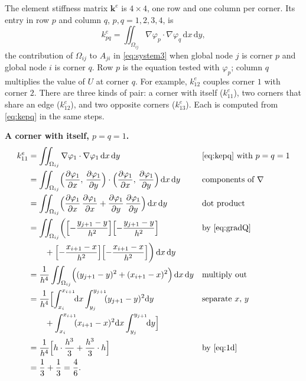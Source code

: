 \documentclass[11pt]{article}
\newcommand{\dxdy}{\,\mathrm{d}x\,\mathrm{d}y}
\newcommand{\Om}{\Omega}
\newcommand{\grad}{\nabla}
\begin{document}
The element stiffness matrix $\bm k^{e}$ is $4\times4$, one row and one
column per corner.  Its entry in row $p$ and column $q$, $p,q=1,2,3,4$, is
\begin{equation}\label{eq:kepq}
  k^{e}_{pq}=\iint_{\Om_{ij}}\grad\varphi_{p}\cdot\grad\varphi_{q}\dxdy ,
\end{equation}
the contribution of $\Om_{ij}$ to $A_{ji}$ in \eqref{eq:system3} when global
node $j$ is corner $p$ and global node $i$ is corner $q$.  Row $p$ is the
equation tested with $\varphi_{p}$; column $q$ multiplies the value of $U$ at
corner $q$.  For example, $k^{e}_{12}$ couples corner $1$ with corner $2$.
There are three kinds of pair: a corner with itself ($k^{e}_{11}$), two
corners that share an edge ($k^{e}_{12}$), and two opposite corners
($k^{e}_{13}$).  Each is computed from \eqref{eq:kepq} in the same steps.

\textbf{A corner with itself, $p=q=1$.}
\begin{align}
  k^{e}_{11}
  &=\iint_{\Om_{ij}}\grad\varphi_{1}\cdot\grad\varphi_{1}\dxdy
   &&\text{\eqref{eq:kepq} with }p=q=1\notag\\
  &=\iint_{\Om_{ij}}\Bigl(\frac{\partial\varphi_{1}}{\partial x},\,\frac{\partial\varphi_{1}}{\partial y}\Bigr)\cdot\Bigl(\frac{\partial\varphi_{1}}{\partial x},\,\frac{\partial\varphi_{1}}{\partial y}\Bigr)\dxdy
   &&\text{components of }\grad\notag\\
  &=\iint_{\Om_{ij}}\Bigl(\frac{\partial\varphi_{1}}{\partial x}\,\frac{\partial\varphi_{1}}{\partial x}+\frac{\partial\varphi_{1}}{\partial y}\,\frac{\partial\varphi_{1}}{\partial y}\Bigr)\dxdy
   &&\text{dot product}\notag\\
  &=\iint_{\Om_{ij}}\biggl(\Bigl[-\frac{y_{j+1}-y}{h^{2}}\Bigr]\Bigl[-\frac{y_{j+1}-y}{h^{2}}\Bigr]
   &&\text{by \eqref{eq:gradQ}}\notag\\
  &\qquad+\Bigl[-\frac{x_{i+1}-x}{h^{2}}\Bigr]\Bigl[-\frac{x_{i+1}-x}{h^{2}}\Bigr]\biggr)\dxdy\notag\\
  &=\frac{1}{h^{4}}\iint_{\Om_{ij}}\Bigl((y_{j+1}-y)^{2}+(x_{i+1}-x)^{2}\Bigr)\dxdy
   &&\text{multiply out}\notag\\
  &=\frac{1}{h^{4}}\Bigl[\int_{x_{i}}^{x_{i+1}}\!\!\mathrm{d}x\int_{y_{j}}^{y_{j+1}}\!\!(y_{j+1}-y)^{2}\mathrm{d}y
   &&\text{separate }x,\,y\notag\\
  &\qquad+\int_{x_{i}}^{x_{i+1}}\!\!(x_{i+1}-x)^{2}\mathrm{d}x\int_{y_{j}}^{y_{j+1}}\!\!\mathrm{d}y\Bigr]\notag\\
  &=\frac{1}{h^{4}}\Bigl[h\cdot\frac{h^{3}}{3}+\frac{h^{3}}{3}\cdot h\Bigr]
   &&\text{by \eqref{eq:1d}}\notag\\
  &=\frac13+\frac13=\frac46 .\label{eq:ke11}
\end{align}
\end{document}
